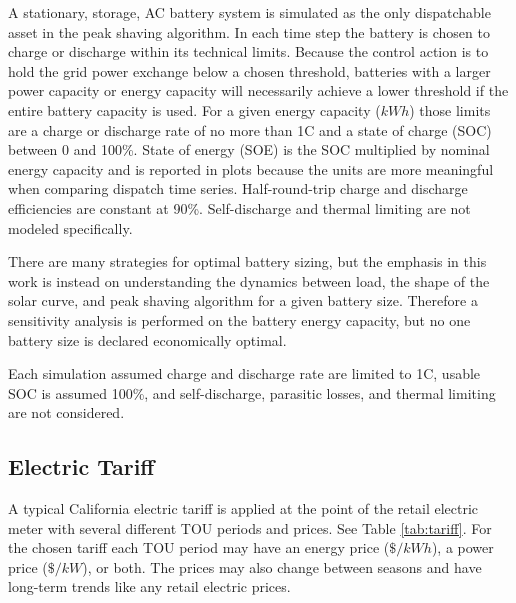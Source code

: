 \documentclass[journal,article,submit,pdftex,moreauthors]{Definitions/mdpi}
\begin{document}
A stationary, storage, AC battery system is simulated as the only dispatchable asset in the peak shaving algorithm. In each time step the battery is chosen to charge or discharge within its technical limits. Because the control action is to hold the grid power exchange below a chosen threshold, batteries with a larger power capacity or energy capacity will necessarily achieve a lower threshold if the entire battery capacity is used. For a given energy capacity (\(kWh\)) those limits are a charge or discharge rate of no more than 1C and a state of charge (SOC) between 0 and 100\%. State of energy (SOE) is the SOC multiplied by nominal energy capacity and is reported in plots because the units are more meaningful when comparing dispatch time series. Half-round-trip charge and discharge efficiencies are constant at 90\%. Self-discharge and thermal limiting are not modeled specifically.

There are many strategies for optimal battery sizing, but the emphasis in this work is instead on understanding the dynamics between load, the shape of the solar curve, and peak shaving algorithm for a given battery size. Therefore a sensitivity analysis is performed on the battery energy capacity, but no one battery size is declared economically optimal.

Each simulation assumed charge and discharge rate are limited to 1C, usable SOC is assumed 100\%, and self-discharge, parasitic losses, and thermal limiting are not considered.

\subsection{Electric Tariff}\label{electric-tariff}%

A typical California electric tariff is applied at the point of the retail electric meter with several different TOU periods and prices. See Table \ref{tab:tariff}. For the chosen tariff each TOU period may have an energy price (\(\$/kWh\)), a power price (\(\$/kW\)), or both. The prices may also change between seasons and have long-term trends like any retail electric prices. 
\end{document}
